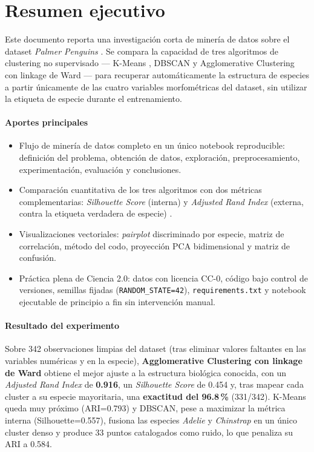 \section*{Resumen ejecutivo}

Este documento reporta una investigación corta de minería de datos sobre el dataset \emph{Palmer Penguins} \citep{horst2020palmer,gorman2014ecological}. Se compara la capacidad de tres algoritmos de clustering no supervisado --- K-Means \citep{macqueen1967some}, DBSCAN \citep{ester1996density} y Agglomerative Clustering con linkage de Ward \citep{ward1963hierarchical} --- para recuperar automáticamente la estructura de especies a partir únicamente de las cuatro variables morfométricas del dataset, sin utilizar la etiqueta de especie durante el entrenamiento.

\paragraph{Aportes principales}
\begin{itemize}
  \item Flujo de minería de datos completo en un único notebook reproducible: definición del problema, obtención de datos, exploración, preprocesamiento, experimentación, evaluación y conclusiones.
  \item Comparación cuantitativa de los tres algoritmos con dos métricas complementarias: \emph{Silhouette Score} (interna) y \emph{Adjusted Rand Index} (externa, contra la etiqueta verdadera de especie) \citep{rand1971objective,hubert1985comparing,rousseeuw1987silhouettes}.
  \item Visualizaciones vectoriales: \emph{pairplot} discriminado por especie, matriz de correlación, método del codo, proyección PCA bidimensional y matriz de confusión.
  \item Práctica plena de Ciencia 2.0: datos con licencia CC-0, código bajo control de versiones, semillas fijadas (\texttt{RANDOM\_STATE=42}), \texttt{requirements.txt} y notebook ejecutable de principio a fin sin intervención manual.
\end{itemize}

\paragraph{Resultado del experimento}
Sobre 342 observaciones limpias del dataset (tras eliminar valores faltantes en las variables numéricas y en la especie), \textbf{Agglomerative Clustering con linkage de Ward} obtiene el mejor ajuste a la estructura biológica conocida, con un \emph{Adjusted Rand Index} de \textbf{0.916}, un \emph{Silhouette Score} de 0.454 y, tras mapear cada cluster a su especie mayoritaria, una \textbf{exactitud del 96.8\,\%} (331/342). K-Means queda muy próximo (ARI=0.793) y DBSCAN, pese a maximizar la métrica interna (Silhouette=0.557), fusiona las especies \emph{Adelie} y \emph{Chinstrap} en un único cluster denso y produce 33 puntos catalogados como ruido, lo que penaliza su ARI a 0.584.

